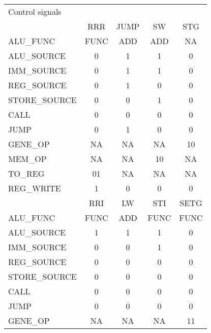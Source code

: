\begin{table}
    \centering
    \begin{tabular}{| l | c | c | c |c |}
    \hline
    Control signals   &              &          &       &            \\
                      & RRR          & JUMP     &  SW   &  STG       \\
    \hline
    ALU\_FUNC         & FUNC         & ADD      &  ADD   &  NA        \\ 
    ALU\_SOURCE       &  0           & 1        &  1     &  0         \\
    IMM\_SOURCE       &  0           & 1        &  1     &  0         \\
    REG\_SOURCE       &  0           & 1        &  0     &  0         \\
    STORE\_SOURCE     &  0           & 0        &  1     &  0         \\
    CALL              &  0           & 0        &  0     &  0         \\
    JUMP              &  0           & 1        &  0     &  0         \\
    GENE\_OP          &  NA          & NA       &  NA    &  10        \\
    MEM\_OP           &  NA          & NA       &  10    &  NA        \\
    TO\_REG           &  01          & NA       &  NA    &  NA        \\
    REG\_WRITE        &  1           & 0        &  0     &  0         \\
    \hline  
                      & RRI          & LW       & STI    & SETG       \\
    \hline
    ALU\_FUNC         & FUNC         & ADD      & FUNC   & FUNC       \\
    ALU\_SOURCE       &  1           &  1       &  1     &  0         \\
    IMM\_SOURCE       &  0           &  0       &  1     &  0         \\
    REG\_SOURCE       &  0           &  0       &  0     &  0         \\
    STORE\_SOURCE     &  0           &  0       &  0     &  0         \\
    CALL              &  0           &  0       &  0     &  0         \\
    JUMP              &  0           &  0       &  0     &  0         \\
    GENE\_OP          &  NA          &  NA      &  NA    &  11        \\

\end{tabular}
\end{table}
